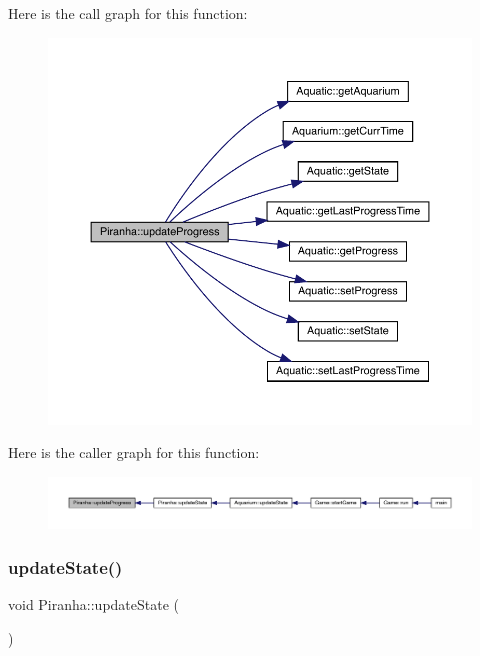 Here is the call graph for this function\+:\nopagebreak
\begin{figure}[H]
\begin{center}
\leavevmode
\includegraphics[width=350pt]{class_piranha_ac4906080867655ef09591eba1cf2f00c_cgraph}
\end{center}
\end{figure}
Here is the caller graph for this function\+:\nopagebreak
\begin{figure}[H]
\begin{center}
\leavevmode
\includegraphics[width=350pt]{class_piranha_ac4906080867655ef09591eba1cf2f00c_icgraph}
\end{center}
\end{figure}
\mbox{\label{class_piranha_a851c302af9de1d6eaf727242e2912f62}} 
\subsubsection{\texorpdfstring{update\+State()}{updateState()}}
{\footnotesize\ttfamily void Piranha\+::update\+State (\begin{DoxyParamCaption}{ }\end{DoxyParamCaption})\hspace{0.3cm}{\ttfamily [virtual]}}



